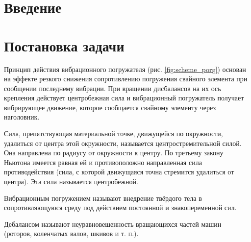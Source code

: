 \section*{Введение}


\clearpage
\section{Постановка задачи}

Принцип действия вибрационного погружателя (рис. \ref{fig:scheme_porg}) основан на эффекте резкого снижения сопротивлению погружения свайного элемента при сообщении последнему вибрации. При вращении дисбалансов на их ось крепления действует центробежная сила и вибрационный погружатель получает вибрирующее движение, которое сообщается свайному элементу через наголовник.

\begin{definition}
    Сила, препятствующая материальной точке, движущейся по окружности, удалиться от центра этой окружности, называется центростремительной силой. Она направлена по радиусу от окружности к центру. По третьему закону Ньютона имеется равная ей и противоположно направленная сила противодействия (сила, с которой движущаяся точна стремится удалиться от центра). Эта сила называется центробежной.
\end{definition}

\begin{definition}
    Вибрационным погружением называют внедрение твёрдого тела в сопротивляющуюся среду под действием постоянной и знакопеременной сил.
\end{definition}


\begin{definition}
    Дебалансом называют неуравновешенность вращающихся частей машин (роторов, коленчатых валов, шкивов и т. п.).
\end{definition}

